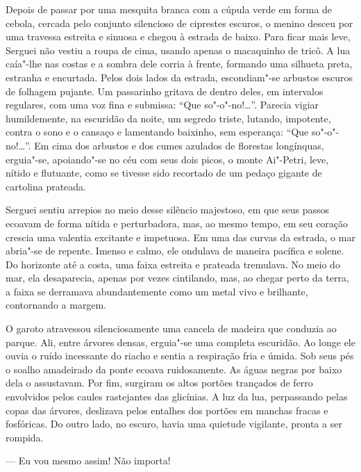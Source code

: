 Depois de passar por uma mesquita branca com a cúpula verde em forma de
cebola, cercada pelo conjunto silencioso de ciprestes escuros, o menino
desceu por uma travessa estreita e sinuosa e chegou à estrada de baixo.
Para ficar mais leve, Serguei não vestiu a roupa de cima, usando apenas
o macaquinho de tricô. A lua caía"-lhe nas costas e a sombra dele corria
à frente, formando uma silhueta preta, estranha e encurtada. Pelos dois
lados da estrada, escondiam"-se arbustos escuros de folhagem pujante. Um
passarinho gritava de dentro deles, em intervalos regulares, com uma voz
fina e submissa: ``Que so"-o"-no!\ldots{}''. Parecia vigiar humildemente, na
escuridão da noite, um segredo triste, lutando, impotente, contra o sono
e o cansaço e lamentando baixinho, sem esperança: ``Que so"-o"-no!\ldots{}''. Em
cima dos arbustos e dos cumes azulados de florestas longínquas,
erguia"-se, apoiando"-se no céu com seus dois picos, o monte Ai"-Petri,
leve, nítido e flutuante, como se tivesse sido recortado de um pedaço
gigante de cartolina prateada.

Serguei sentiu arrepios no meio desse silêncio majestoso, em que seus
passos ecoavam de forma nítida e perturbadora, mas, ao mesmo tempo, em
seu coração crescia uma valentia excitante e impetuosa. Em uma das
curvas da estrada, o mar abria"-se de repente. Imenso e calmo, ele
ondulava de maneira pacífica e solene. Do horizonte até a costa, uma
faixa estreita e prateada tremulava. No meio do mar, ela desaparecia,
apenas por vezes cintilando, mas, ao chegar perto da terra, a faixa se
derramava abundantemente como um metal vivo e brilhante, contornando a
margem.

O garoto atravessou silenciosamente uma cancela de madeira que conduzia
ao parque. Ali, entre árvores densas, erguia"-se uma completa escuridão.
Ao longe ele ouvia o ruído incessante do riacho e sentia a respiração
fria e úmida. Sob seus pés o soalho amadeirado da ponte ecoava
ruidosamente. As águas negras por baixo dela o assustavam. Por fim,
surgiram os altos portões trançados de ferro envolvidos pelos caules
rastejantes das glicínias. A luz da lua, perpassando pelas copas das
árvores, deslizava pelos entalhes dos portões em manchas fracas e
fosfóricas. Do outro lado, no escuro, havia uma quietude vigilante,
pronta a ser rompida.


--- Eu vou mesmo assim! Não importa!

